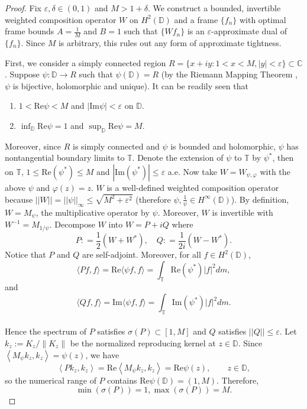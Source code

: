 \documentclass{amsart}
\theoremstyle{definition}
\theoremstyle{remark}
\numberwithin{equation}{section}
\newcommand{\ip}[2]{\left\langle {#1} , {#2} \right\rangle} %
\newcommand{\C}{\mathbb{C}} %
\newcommand{\D}{\mathbb{D}} %
\newcommand{\T}{\mathbb{T}} %
\begin{document}
\begin{proof}
Fix $\varepsilon, \delta \in (0,1)$ and $M > 1+\delta$. We construct a bounded, invertible
weighted composition operator $W$ on $H^2(\mathbb{D})$ and a frame
$\{f_n\}$ with optimal frame bounds $A = \tfrac{1}{M}$ and $B = 1$ such
that $\{W f_n\}$ is an $\varepsilon$-approximate dual of $\{f_n\}$. Since
$M$ is arbitrary, this rules out any form of approximate tightness.

First, we consider a simply connected region $R = \{ x+iy: 1<x<M, |y|<\varepsilon \} \subset \C$. Suppose $\psi: \D \to R$ such that $\psi(\D)=R$ (by the Riemann Mapping Theorem \cite{ahlfors1979complex}, $\psi$ is bijective, holomorphic and unique). It can be readily seen that 
\begin{enumerate}
  \item $1 < \text{Re}{\psi} < M$ and $|\text{Im}\psi| < \varepsilon$ on $\D$.
    \item $\inf_{\D} \text{Re} \psi =1$ and $\sup_{\D} \text{Re} \psi =M$.
\end{enumerate}
Moreover, since $R$ is simply connected and $\psi$ is bounded and holomorphic, $\psi$ has nontangential boundary limits to $\T$. Denote the extension of $\psi$ to $\T$ by $\psi^*$, then on $\T$, $1\leq \text{Re}(\psi^*) \leq M$ and $|\text{Im}(\psi^*)|\leq \varepsilon$ a.e. Now take $W = W_{\psi, \varphi}$ with the above $\psi$ and $\varphi(z) =z$. $W$ is a well-defined weighted composition operator because $||W|| = ||\psi||_{\infty} \leq \sqrt{M^2 + \varepsilon^2}$ (therefore $\psi, \tfrac{1}{\psi} \in H^{\infty}(\D)$). By definition, $W = M_{\psi}$, the multiplicative operator by $\psi$. Moreover, $W$ is invertible with $W^{-1} = M_{1/\psi}$. Decompose $W$ into $W = P +iQ$ where
$$
P : = \frac{1}{2}(W+W^*), \quad Q : = \frac{1}{2i}(W-W^*).
$$
Notice that $P$ and $Q$ are self-adjoint. Moreover, for all $ f \in H^2(\D)$,
$$\langle Pf,f\rangle = \text{Re}\langle \psi f, f\rangle=\int_\T \text{Re}(\psi^*) |f|^2 dm,$$
and
$$\langle Qf,f\rangle = \text{Im}\langle \psi f, f\rangle=\int_\T \text{Im}(\psi^*) |f|^2 dm.$$
\\
Hence the spectrum of $P$ satisfies $\sigma (P)\subset [1,M]$ and $Q$ satisfies $||Q||\leq \varepsilon$.  Let $k_z:=K_z/\|K_z\|$ be the normalized reproducing kernel at $z\in\D$.  Since
$\ip{M_{\psi}k_z}{k_z}=\psi(z)$, we have
\[
  \ip{Pk_z}{k_z}=\text{Re}\ip{M_{\psi}k_z}{k_z}=\text{Re}\psi(z),
  \qquad z\in\D ,
\]
so the numerical range of $P$ contains $\text{Re}\psi(\D)=(1,M)$. Therefore, 
$$\min(\sigma (P))=1, \max(\sigma (P))=M.$$


\end{proof}
\end{document}
